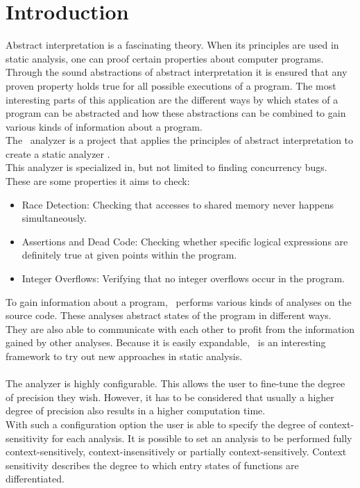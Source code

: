 
\chapter{Introduction}\label{chapter:introduction}
  Abstract interpretation is a fascinating theory. When its principles are used in static analysis, one can proof certain properties about computer programs. Through the sound abstractions of abstract interpretation it is ensured that any proven property holds true for all possible executions of a program. The most interesting parts of this application are the different ways by which states of a program can be abstracted and how these abstractions can be combined to gain various kinds of information about a program.\\
  The \gob\ analyzer is a project that applies the principles of abstract interpretation to create a static analyzer \parencite{goblintHome}.\\
  This analyzer is specialized in, but not limited to finding concurrency bugs. These are some properties it aims to check:
  \begin{itemize}
    \item Race Detection: Checking that accesses to shared memory never happens simultaneously.
    \item Assertions and Dead Code: Checking whether specific logical expressions are definitely true at given points within the program. 
    \item Integer Overflows: Verifying that no integer overflows occur in the program.
  \end{itemize}
  To gain information about a program, \gob\ performs various kinds of analyses on the source code. These analyses abstract states of the program in different ways. They are also able to communicate with each other to profit from the information gained by other analyses. Because it is easily expandable, \gob\ is an interesting framework to try out new approaches in static analysis.\\
  \\
  The analyzer is highly configurable. This allows the user to fine-tune the degree of precision they wish. However, it has to be considered that usually a higher degree of precision also results in a higher computation time.\\
  With such a configuration option the user is able to specify the degree of context-sensitivity for each analysis. It is possible to set an analysis to be performed fully context-sensitively, context-insensitively or partially context-sensitively. Context sensitivity describes the degree to which entry states of functions are differentiated.\\
